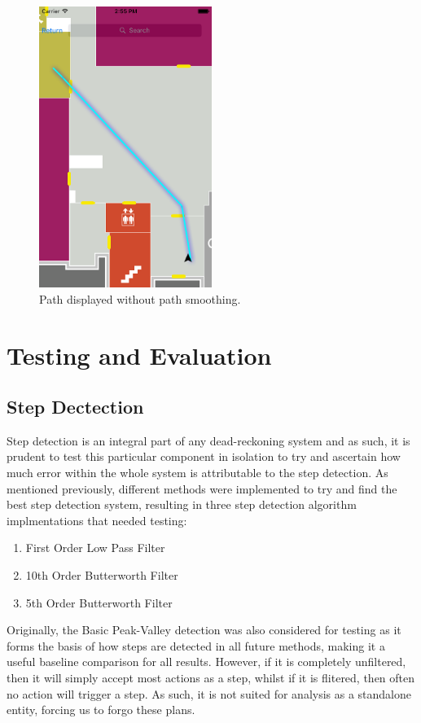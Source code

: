 \documentclass[12pt,a4paper]{report}
\begin{document}
\begin{figure}[]
\center
\includegraphics[width=0.5\textwidth]{images/smoothPath.png}
\caption{Path displayed without path smoothing.}
\label{fig:smoothPath}
\end{figure}


\chapter{Testing and Evaluation}

\section{Step Dectection}

Step detection is an integral part of any dead-reckoning system and as such, 
it is prudent to test this particular component in isolation to try and ascertain how much error within the whole system is attributable to the step detection.
As mentioned previously, different methods were implemented to try and find the best step detection system, resulting in three step detection algorithm implmentations that needed testing:
\begin{enumerate}
	\item First Order Low Pass Filter
	\item 10th Order Butterworth Filter
	\item 5th Order Butterworth Filter
\end{enumerate}

Originally, the Basic Peak-Valley detection was also considered for testing as it forms the basis of how steps are detected in all future methods, making it a useful baseline comparison for all results. However, if it is completely unfiltered, then it will simply accept most actions as a step, whilst if it is flitered, then often no action will trigger a step. As such, it is not suited for analysis as a standalone entity, forcing us to forgo these plans.
\end{document}
